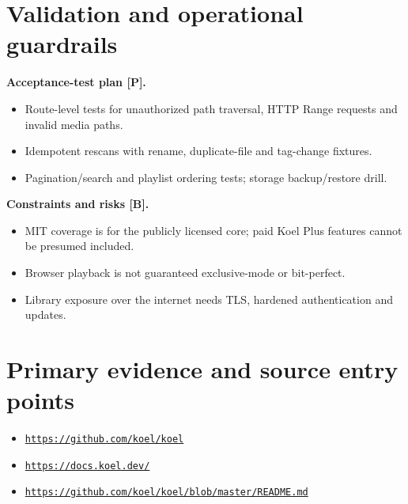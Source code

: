 \documentclass[10pt,a4paper,oneside]{report}
\newcommand{\sourceurl}[1]{\href{#1}{\texttt{\nolinkurl{#1}}}}
\begin{document}
\section{Validation and operational guardrails}
\textbf{Acceptance-test plan [P].}\par
\begin{itemize}[leftmargin=*,itemsep=2pt,topsep=3pt]
\item Route-level tests for unauthorized path traversal, HTTP Range requests and invalid media paths.
\item Idempotent rescans with rename, duplicate-file and tag-change fixtures.
\item Pagination/search and playlist ordering tests; storage backup/restore drill.
\end{itemize}
\textbf{Constraints and risks [B].}\par
\begin{itemize}[leftmargin=*,itemsep=2pt,topsep=3pt]
\item MIT coverage is for the publicly licensed core; paid Koel Plus features cannot be presumed included.
\item Browser playback is not guaranteed exclusive-mode or bit-perfect.
\item Library exposure over the internet needs TLS, hardened authentication and updates.
\end{itemize}
\section*{Primary evidence and source entry points}
\begin{itemize}[leftmargin=*,itemsep=1pt,topsep=1pt]
\item \sourceurl{https://github.com/koel/koel}
\item \sourceurl{https://docs.koel.dev/}
\item \sourceurl{https://github.com/koel/koel/blob/master/README.md}
\end{itemize}
\clearpage
\end{document}
